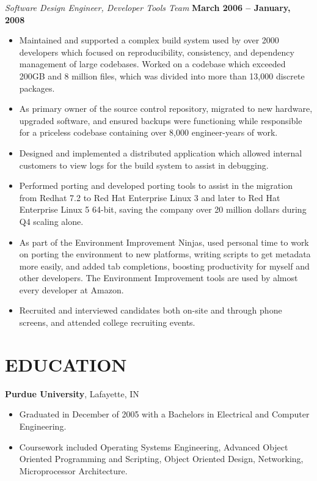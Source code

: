 \documentclass[line, margin]{res}
\begin{document}
\begin{resume}
\textit{Software Design Engineer, Developer Tools Team} \hfill {\bf March 2006 -- January, 2008}
\\
\begin{itemize}
\item
Maintained and supported a complex build system used by over 2000 developers
which focused on reproducibility, consistency, and dependency management of
large codebases.  Worked on a codebase which exceeded 200GB and 8 million
files, which was divided into more than 13,000 discrete packages.
\item
As primary owner of the source control repository, migrated to new hardware,
upgraded software, and ensured backups were functioning while responsible for a
priceless codebase containing over 8,000 engineer-years of work.
\item
Designed and implemented a distributed application which allowed internal
customers to view logs for the build system to assist in debugging.
\item
Performed porting and developed porting tools to assist in the migration from
Redhat 7.2 to Red Hat Enterprise Linux 3 and later to Red Hat Enterprise Linux
5 64-bit, saving the company over 20 million dollars during Q4 scaling alone.
\item
As part of the Environment Improvement Ninjas, used personal time to work on
porting the environment to new platforms, writing scripts to get metadata more
easily, and added tab completions, boosting productivity for myself and other
developers.  The Environment Improvement tools are used by almost every
developer at Amazon.
\item
Recruited and interviewed candidates both on-site and through phone screens,
and attended college recruiting events.
\end{itemize}

\section{EDUCATION}

{\bf Purdue University}, Lafayette, IN
\begin{itemize}
\item
Graduated in December of 2005 with a Bachelors in Electrical and Computer
Engineering.
\item
Coursework included Operating Systems Engineering, Advanced Object Oriented
Programming and Scripting, Object Oriented Design, Networking, Microprocessor
Architecture.
\end{itemize}


\end{resume}
\end{document}

